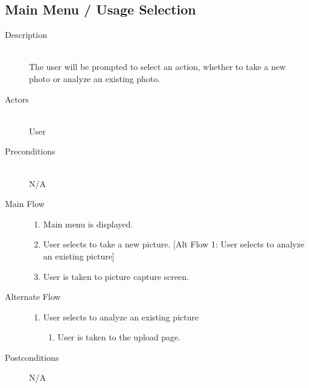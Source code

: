\subsection{Main Menu / Usage Selection}
\begin{description}
    \item[Description] \hfill \\
        The user will be prompted to select an action, whether to take a new photo or analyze an existing photo.
    \item[Actors] \hfill \\
        User
    \item[Preconditions] \hfill \\
            N/A
    \item[Main Flow] \hfill 
        \begin{enumerate}
            \item Main menu is displayed.
            \item User selects to take a new picture.
                [Alt Flow 1: User selects to analyze an existing picture]
            \item User is taken to picture capture screen.
        \end{enumerate}
    \item[Alternate Flow] \hfill 
        \begin{enumerate}
            \item User selects to analyze an existing picture
                \begin{enumerate}
                    \item User is taken to the upload page.
                \end{enumerate}
        \end{enumerate}
    \item[Postconditions]
        N/A
\end{description}
\myspace

